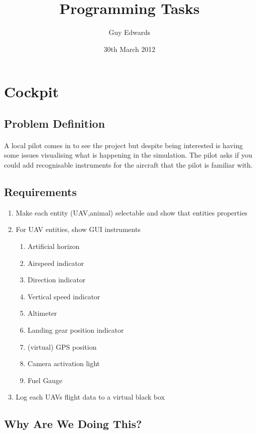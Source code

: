 \documentclass[11pt]{book}
\title{\textbf{Programming Tasks}}
\author{Guy Edwards}
\date{30th March 2012}
\begin{document}
\section{Cockpit}

\subsection{Problem Definition}

\paragraph{} A local pilot comes in to see the project but despite being interested is having some issues visualising what is happening in the simulation. The pilot asks if you could add recognisable instruments for the aircraft that the pilot is familiar with.

\subsection{Requirements}

\begin{enumerate}
\item Make each entity (UAV,animal) selectable and show that entities properties
\item For UAV entities, show GUI instruments
    \begin{enumerate}
        \item Artificial horizon
        \item Airspeed indicator
        \item Direction indicator
        \item Vertical speed indicator
        \item Altimeter
        \item Landing gear position indicator
        \item (virtual) GPS position
        \item Camera activation light
        \item Fuel Gauge
    \end{enumerate}
\item Log each UAVs flight data to a virtual black box
\end{enumerate}

\subsection{Why Are We Doing This?}
\end{document}
